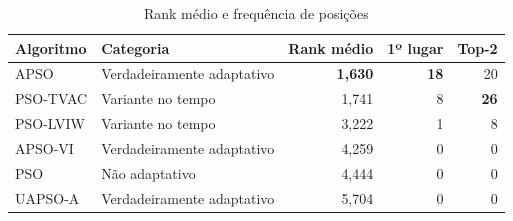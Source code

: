 \begin{table}[!htbp]
    \centering
    \caption{Rank médio e frequência de posições}
    \label{tab:ranking_algoritmos}
    \small
    \begin{tabular*}{\linewidth}{@{\extracolsep{\fill}}llrrr@{}}
        \toprule
        \textbf{Algoritmo}
        & \textbf{Categoria}
        & \textbf{Rank médio}
        & \textbf{1º lugar}
        & \textbf{Top-2} \\
        \midrule

        APSO
        & Verdadeiramente adaptativo
        & \textbf{1,630}
        & \textbf{18}
        & 20 \\

        PSO-TVAC
        & Variante no tempo
        & 1,741
        & 8
        & \textbf{26} \\

        PSO-LVIW
        & Variante no tempo
        & 3,222
        & 1
        & 8 \\

        APSO-VI
        & Verdadeiramente adaptativo
        & 4,259
        & 0
        & 0 \\

        PSO
        & Não adaptativo
        & 4,444
        & 0
        & 0 \\

        UAPSO-A
        & Verdadeiramente adaptativo
        & 5,704
        & 0
        & 0 \\

        \bottomrule
    \end{tabular*}
\end{table}
